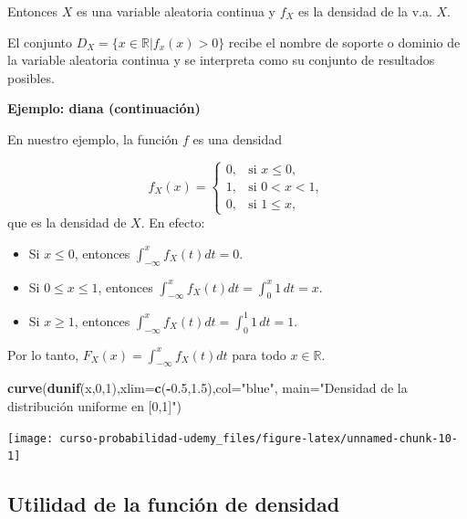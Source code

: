 \documentclass[]{book}
\newenvironment{Shaded}{\begin{snugshade}}{\end{snugshade}}
\newcommand{\DataTypeTok}[1]{\textcolor[rgb]{0.13,0.29,0.53}{#1}}
\newcommand{\DecValTok}[1]{\textcolor[rgb]{0.00,0.00,0.81}{#1}}
\newcommand{\FloatTok}[1]{\textcolor[rgb]{0.00,0.00,0.81}{#1}}
\newcommand{\KeywordTok}[1]{\textcolor[rgb]{0.13,0.29,0.53}{\textbf{#1}}}
\newcommand{\NormalTok}[1]{#1}
\newcommand{\OperatorTok}[1]{\textcolor[rgb]{0.81,0.36,0.00}{\textbf{#1}}}
\newcommand{\StringTok}[1]{\textcolor[rgb]{0.31,0.60,0.02}{#1}}
\begin{document}
Entonces \(X\) es una variable aleatoria continua y \(f_X\) es la densidad de la v.a. \(X\).

El conjunto \(D_X=\{x\in\mathbb{R}| f_x(x)>0\}\) recibe el nombre de soporte o dominio de la
variable aleatoria continua y se interpreta como su conjunto de resultados posibles.

\textbf{Ejemplo: diana (continuación)}

En nuestro ejemplo, la función \(f\) es una densidad

\[
f_{X}(x)=\left\{
\begin{array}{ll}
0, & \mbox{si } x\leq 0,\\
1, & \mbox{si } 0 < x < 1,\\
0, & \mbox{si } 1\leq x,
\end{array}\right.
\]
que es la densidad de \(X\). En efecto:

\begin{itemize}
\item
  Si \(x \leq 0\), entonces \(\displaystyle\int_{-\infty}^x f_X(t) dt = 0.\)
\item
  Si \(0\leq x\leq 1\), entonces \(\displaystyle\int_{-\infty}^x f_X(t) dt = \int_0^x 1\, dt = x.\)
\item
  Si \(x\geq 1\), entonces \(\displaystyle\int_{-\infty}^x f_X(t) dt = \int_0^1 1\, dt = 1.\)
\end{itemize}

Por lo tanto, \(F_X(x)=\displaystyle\int_{-\infty}^x f_X(t) dt\) para todo \(x\in\mathbb{R}.\)

\begin{Shaded}
\begin{Highlighting}[]
\KeywordTok{curve}\NormalTok{(}\KeywordTok{dunif}\NormalTok{(x,}\DecValTok{0}\NormalTok{,}\DecValTok{1}\NormalTok{),}\DataTypeTok{xlim=}\KeywordTok{c}\NormalTok{(}\OperatorTok{-}\FloatTok{0.5}\NormalTok{,}\FloatTok{1.5}\NormalTok{),}\DataTypeTok{col=}\StringTok{"blue"}\NormalTok{,}
      \DataTypeTok{main=}\StringTok{"Densidad de la distribución uniforme en [0,1]"}\NormalTok{)}
\end{Highlighting}
\end{Shaded}

\begin{center}\texttt{[image: curso-probabilidad-udemy\_files/figure-latex/unnamed-chunk-10-1]} \end{center}

\hypertarget{utilidad-de-la-funciuxf3n-de-densidad}{%
\subsection{Utilidad de la función de densidad}\label{utilidad-de-la-funciuxf3n-de-densidad}}
\end{document}
